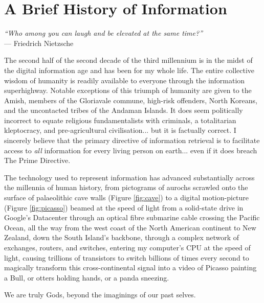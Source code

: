 \chapter{A Brief History of Information}


\begin{flushright}
    \textit{``Who among you can laugh and be elevated at the same time?''}
    \\ --- Friedrich Nietzsche
\end{flushright}

The second half of the second decade of the third millennium is in the midst of the digital information age and has been for my whole life. The entire collective wisdom of humanity is readily available to everyone through the information superhighway. Notable exceptions of this triumph of humanity are given to the Amish, members of the Gloriavale commune, high-risk offenders, North Koreans, and the uncontacted tribes of the Andaman Islands. It does seem politically incorrect to equate religious fundamentalists with criminals, a totalitarian kleptocracy, and pre-agricultural civilisation... but it is factually correct. I sincerely believe that the primary directive of information retrieval is to facilitate access to \textit{all} information for every living person on earth... even if it does breach The Prime Directive.

The technology used to represent information has advanced substantially across the millennia of human history, from pictograms of aurochs scrawled onto the surface of palaeolithic cave walls (Figure \ref{fig:cave}) to a digital motion-picture (Figure \ref{fig:picasso}) beamed at the speed of light from a solid-state drive in Google's Datacenter through an optical fibre submarine cable crossing the Pacific Ocean, all the way from the west coast of the North American continent to New Zealand, down the South Island's backbone, through a complex network of exchanges, routers, and switches, entering my computer's CPU at the speed of light, causing trillions of transistors to switch billions of times every second to magically transform this cross-continental signal into a video of Picasso painting a Bull, or otters holding hands, or a panda sneezing.

We are truly Gods, beyond the imaginings of our past selves.

\newpage

